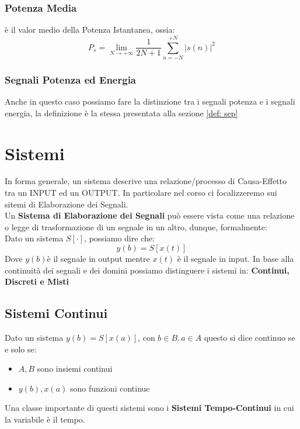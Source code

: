 \subsubsection{Potenza Media}
è il valor medio della Potenza Istantanea, ossia:
\begin{equation}
    P_s =  \lim_{N \rightarrow +\infty} \frac{1}{2N + 1} \sum_{n=-N}^{+N} |s(n)|^2
\end{equation}

\subsubsection{Segnali Potenza ed Energia}
Anche in questo caso possiamo fare la distinzione tra i segnali potenza e i segnali energia, la definizione è la stessa presentata 
alla sezione \eqref{def: sep}

\newpage

\section{Sistemi}
In forma generale, un sistema descrive una relazione/processo di Causa-Effetto tra un INPUT ed un OUTPUT. In particolare nel corso 
ci focalizzeremo sui sitemi di Elaborazione dei Segnali.\\
Un \textbf{Sistema di Elaborazione dei Segnali} può essere vista come una relazione o legge di trasformazione di un segnale in un altro,
dunque, formalmente:\\
Dato un sistema $S[\cdot]$, possiamo dire che:
\begin{equation}
    y(b) = S[x(t)]
\end{equation}
Dove $y(b)$è il segnale in output mentre $x(t)$ è il segnale in input.
In base alla continuità dei segnali e dei domini possiamo distinguere i sistemi in: \textbf{Continui, Discreti e Misti}

\subsection{Sistemi Continui}
Dato un sistema $y(b) = S[x(a)]$, con $b \in B, a \in A$ questo si dice continuo se e solo se:
\begin{itemize}
    \item $A,B$ sono insiemi continui
    \item $y(b),x(a)$ sono funzioni continue
\end{itemize}
Una classe importante di questi sistemi sono i \textbf{Sistemi Tempo-Continui} in cui la variabile è il tempo.

